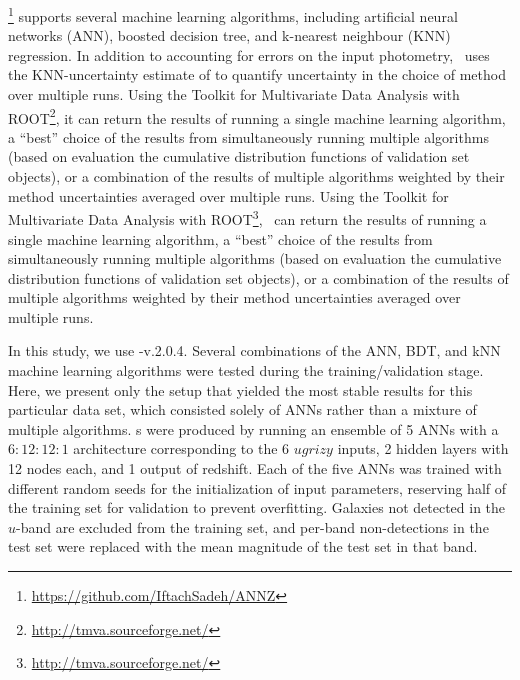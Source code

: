\annz \footnote{\url{https://github.com/IftachSadeh/ANNZ}} \citep{sadeh_annz2:_2016} supports several machine learning algorithms, including artificial neural networks (ANN), boosted decision tree, and k-nearest neighbour (KNN) regression.
In addition to accounting for errors on the input photometry, \annz\ uses the KNN-uncertainty estimate of \citet{oyaizu_photometric_2008} to quantify uncertainty in the choice of method over multiple runs.
Using the Toolkit for Multivariate Data Analysis with ROOT\footnote{\url{http://tmva.sourceforge.net/}}, it can return the results of running a single machine learning algorithm, a ``best'' choice of the results from simultaneously running multiple algorithms (based on evaluation the cumulative distribution functions of validation set objects), or a combination of the results of multiple algorithms weighted by their method uncertainties averaged over multiple runs.
Using the Toolkit for Multivariate Data Analysis with ROOT\footnote{\url{http://tmva.sourceforge.net/}}, \annz\ can return the results of running a single machine learning algorithm, a ``best'' choice of the results from simultaneously running multiple algorithms (based on evaluation the cumulative distribution functions of validation set objects), or a combination of the results of multiple algorithms weighted by their method uncertainties averaged over multiple runs.

In this study, we use \annz-v.2.0.4.
Several combinations of the ANN, BDT, and kNN machine learning algorithms were tested during the training/validation stage.  
Here, we present only the setup that yielded the most stable results for this particular data set, which consisted solely of ANNs rather than a mixture of multiple algorithms.
\Pzpdf s were produced by running an ensemble of 5 ANNs with a $6:12:12:1$ architecture corresponding to the 6 $ugrizy$ inputs, 2 hidden layers with 12 nodes each, and 1 output of redshift.
Each of the five ANNs was trained with different random seeds for the initialization of input parameters, reserving half of the training set for validation to prevent overfitting.
Galaxies not detected in the $u$-band are excluded from the training set, and per-band non-detections in the test set were replaced with the mean magnitude of the test set in that band.

